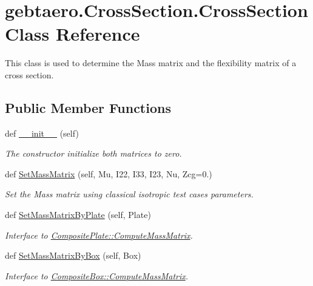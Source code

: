 \hypertarget{classgebtaero_1_1_cross_section_1_1_cross_section}{}\section{gebtaero.\+Cross\+Section.\+Cross\+Section Class Reference}
\label{classgebtaero_1_1_cross_section_1_1_cross_section}


This class is used to determine the Mass matrix and the flexibility matrix of a cross section.  


\subsection*{Public Member Functions}
\begin{DoxyCompactItemize}
\item 
def \hyperlink{classgebtaero_1_1_cross_section_1_1_cross_section_a26142f8a77b098b8725d7d024cfd5199}{\+\_\+\+\_\+init\+\_\+\+\_\+} (self)
\begin{DoxyCompactList}\small\item\em The constructor initialize both matrices to zero. \end{DoxyCompactList}\item 
def \hyperlink{classgebtaero_1_1_cross_section_1_1_cross_section_a09866889e6a297e305d32daa5d57e1cb}{Set\+Mass\+Matrix} (self, Mu, I22, I33, I23, Nu, Zcg=0.)
\begin{DoxyCompactList}\small\item\em Set the Mass matrix using classical isotropic test cases parameters. \end{DoxyCompactList}\item 
def \hyperlink{classgebtaero_1_1_cross_section_1_1_cross_section_a0e87dd20eeef95c96cbbeebc0491fe86}{Set\+Mass\+Matrix\+By\+Plate} (self, Plate)
\begin{DoxyCompactList}\small\item\em Interface to \hyperlink{classgebtaero_1_1_composite_plate_1_1_composite_plate_a13b1222bb715056417c9db9903d264a2}{Composite\+Plate\+::\+Compute\+Mass\+Matrix}. \end{DoxyCompactList}\item 
def \hyperlink{classgebtaero_1_1_cross_section_1_1_cross_section_a4914caf35d9b8cfadafe8e359a590d7c}{Set\+Mass\+Matrix\+By\+Box} (self, Box)
\begin{DoxyCompactList}\small\item\em Interface to \hyperlink{classgebtaero_1_1_composite_box_1_1_composite_box_a6b944eeef7002377d7b83c5dd6ae6550}{Composite\+Box\+::\+Compute\+Mass\+Matrix}. \end{DoxyCompactList}\item 

\end{DoxyCompactItemize}

